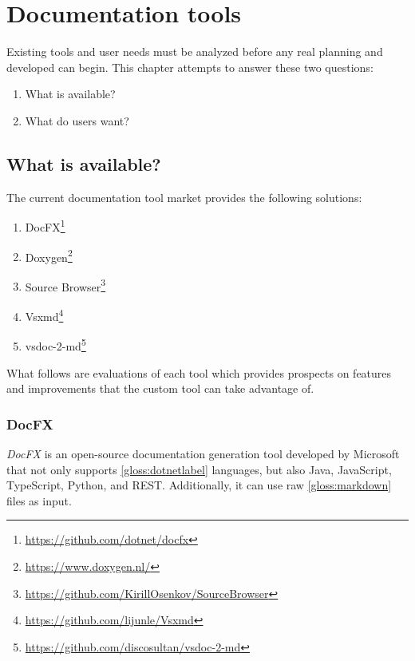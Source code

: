 \chapter{Documentation tools}

Existing tools and user needs must be analyzed before any real planning and developed can begin. This chapter attempts to answer these two questions:
\begin{enumerate}
    \item What is available?
    \item What do users want?
\end{enumerate}

\section{What is available?} \label{sec:whatisavailable}
The current documentation tool market provides the following solutions:

\begin{enumerate}
    \item DocFX\footnote{\href{https://github.com/dotnet/docfx}{https://github.com/dotnet/docfx}}
    \item Doxygen\footnote{\href{https://www.doxygen.nl/}{https://www.doxygen.nl/}}
    \item Source Browser\footnote{\href{https://github.com/KirillOsenkov/SourceBrowser}{https://github.com/KirillOsenkov/SourceBrowser}}
    \item Vsxmd\footnote{\href{https://github.com/lijunle/Vsxmd}{https://github.com/lijunle/Vsxmd}}
    \item vsdoc-2-md\footnote{\href{https://github.com/discosultan/vsdoc-2-md}{https://github.com/discosultan/vsdoc-2-md}}
\end{enumerate}

What follows are evaluations of each tool which provides prospects on features and improvements that the custom tool can take advantage of.

\subsection{DocFX} \label{ssec:docfx}

\textit{DocFX} is an open-source documentation generation tool developed by Microsoft that not only supports \ref{gloss:dotnetlabel} languages, but also Java, JavaScript, TypeScript, Python, and REST. Additionally, it can use raw \ref{gloss:markdown} files as input.

